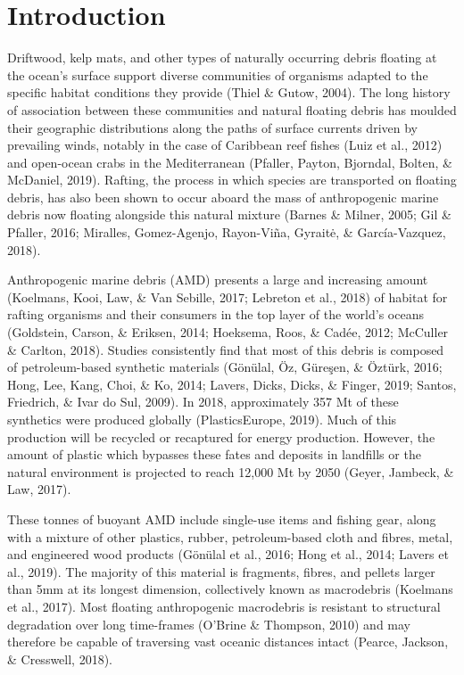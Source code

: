 \documentclass[a4paper, nobind]{templates/ociamthesis}
\begin{document}
\hypertarget{introduction-2}{%
\section{Introduction}\label{introduction-2}}

Driftwood, kelp mats, and other types of naturally occurring debris floating at the ocean's surface support diverse communities of organisms adapted to the specific habitat conditions they provide (Thiel \& Gutow, 2004). The long history of association between these communities and natural floating debris has moulded their geographic distributions along the paths of surface currents driven by prevailing winds, notably in the case of Caribbean reef fishes (Luiz et al., 2012) and open-ocean crabs in the Mediterranean (Pfaller, Payton, Bjorndal, Bolten, \& McDaniel, 2019). Rafting, the process in which species are transported on floating debris, has also been shown to occur aboard the mass of anthropogenic marine debris now floating alongside this natural mixture (Barnes \& Milner, 2005; Gil \& Pfaller, 2016; Miralles, Gomez-Agenjo, Rayon-Viña, Gyraitė, \& García-Vazquez, 2018).

Anthropogenic marine debris (AMD) presents a large and increasing amount (Koelmans, Kooi, Law, \& Van Sebille, 2017; Lebreton et al., 2018) of habitat for rafting organisms and their consumers in the top layer of the world's oceans (Goldstein, Carson, \& Eriksen, 2014; Hoeksema, Roos, \& Cadée, 2012; McCuller \& Carlton, 2018). Studies consistently find that most of this debris is composed of petroleum-based synthetic materials (Gönülal, Öz, Güreşen, \& Öztürk, 2016; Hong, Lee, Kang, Choi, \& Ko, 2014; Lavers, Dicks, Dicks, \& Finger, 2019; Santos, Friedrich, \& Ivar do Sul, 2009). In 2018, approximately 357 Mt of these synthetics were produced globally (PlasticsEurope, 2019). Much of this production will be recycled or recaptured for energy production. However, the amount of plastic which bypasses these fates and deposits in landfills or the natural environment is projected to reach 12,000 Mt by 2050 (Geyer, Jambeck, \& Law, 2017).

These tonnes of buoyant AMD include single-use items and fishing gear, along with a mixture of other plastics, rubber, petroleum-based cloth and fibres, metal, and engineered wood products (Gönülal et al., 2016; Hong et al., 2014; Lavers et al., 2019). The majority of this material is fragments, fibres, and pellets larger than 5mm at its longest dimension, collectively known as macrodebris (Koelmans et al., 2017). Most floating anthropogenic macrodebris is resistant to structural degradation over long time-frames (O'Brine \& Thompson, 2010) and may therefore be capable of traversing vast oceanic distances intact (Pearce, Jackson, \& Cresswell, 2018).
\end{document}
